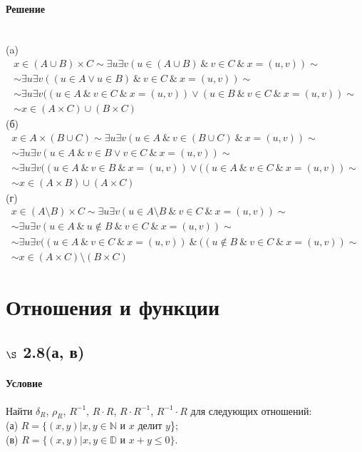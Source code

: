 \documentclass[a4paper,12pt]{article}
\begin{document}
\paragraph*{Решение} \mbox{}\\
(a)
\begin{gather*}
x \in (A \cup B) \times C \sim \exists u \exists v (u\in (A\cup B) \  \& \  v \in C\  \& \   x = (u,v)) \sim \\
\sim  \exists u \exists v ((u\in A \vee u\in B)  \  \& \  v \in C\ \& \  x = (u,v)) \sim\\
\sim \exists u \exists v ((u\in A\  \& \  v\in C \ \& \  x=(u,v)) \vee (u\in B\  \& \  v\in C \  \& \  x=(u,v)) \sim \\
\sim x\in (A\times C) \cup (B\times C)
\end{gather*}
(б)
\begin{gather*}
x \in A \times (B\cup C) \sim \exists u \exists v (u\in A\ \& \ v \in (B\cup C) \  \& \   x = (u,v)) \sim \\
\sim \exists u \exists v (u\in A\  \& \ v\in B \vee v\in C \  \& \   x = (u,v)) \sim \\
\sim \exists u \exists v ((u\in A\ \& \ v\in B \ \& \ x=(u,v)) \vee ((u\in A \ \& \ v\in C \ \& \ x=(u,v)) \sim \\
\sim x \in (A\times B) \cup (A\times C) 
\end{gather*}
(г)
\begin{gather*}
x \in (A\setminus B) \times C \sim \exists u \exists v (u\in A\setminus B \ \& \ v\in C \ \& \ x=(u,v)) \sim \\
\sim \exists u \exists v (u\in A \ \& \ u\notin B \ \& \ v\in C \ \&\ x=(u,v)) \sim \\
\sim \exists u \exists v ((u\in A \ \& \  v\in C \ \&\ x=(u,v)) \ \& \ ((u\notin B \ \& \ v\in C \ \&\ x=(u,v)) \sim \\
\sim x\in  (A\times C)\setminus (B\times C)
\end{gather*}

\section{Отношения и функции}
\subsection*{$\S$ 2.8(а, в)}
\paragraph*{Условие}
Найти $\delta_R$, $\rho_R$, $R^{-1}$, $R\cdot R$, $R\cdot R^{-1}$, $R^{-1}\cdot R$ для следующих отношений:\\
(а) $R=\{(x,y)|x,y\in \mathbb{N}$ и $x$ делит $y$\}; \\
(в) $R=\{(x,y)|x,y\in \mathbb{D}$ и $x+y\leqslant 0\}$.
\end{document}
